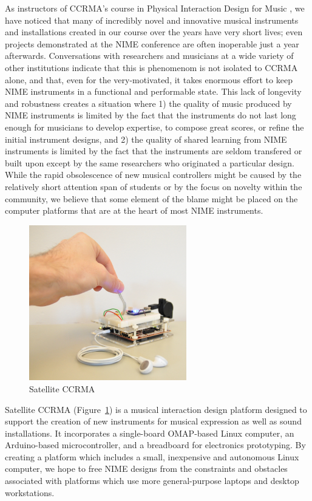 As instructors of CCRMA's course in Physical Interaction Design for Music \cite{Verplank:2001}, we have noticed that many of incredibly novel and innovative musical instruments and installations created in our course over the years have very short lives; even projects demonstrated at the NIME conference \cite{Wilkerson:2002,Shiraiwa:2003,Wilson:2003,Lugo:2005,Carlile:2005,Bowen:2005,Dahl:2007,Schlessinger:2009, Gao:2007} are often inoperable just a year afterwards. Conversations with researchers and musicians at a wide variety of other institutions indicate that this is phenomenom is not isolated to CCRMA alone, and that, even for the very-motivated, it takes enormous effort to keep NIME instruments in a functional and performable state. This lack of longevity and robustness creates a situation where 1) the quality of music produced by NIME instruments is limited by the fact that the instruments do not last long enough for musicians to develop expertise, to compose great scores, or refine the initial instrument designs, and 2) the quality of shared learning from NIME instruments is limited by the fact that the instruments are seldom transfered or built upon except by the same researchers who originated a particular design. While the rapid obsolescence of new musical controllers might be caused by the relatively short attention span of students or by the focus on novelty within the community, we believe that some element of the blame might be placed on the computer platforms that are at the heart of most NIME instruments. 

\begin{figure}[t]
	\centering
		\includegraphics[width=2.7in]{Photos/sat1.eps}
	\caption{Satellite CCRMA}
	\label{Berdahl:fig:Platform}
\end{figure}

Satellite CCRMA (Figure~\ref{Berdahl:fig:Platform}) is a musical interaction design platform designed to support the creation of new instruments for musical expression as well as sound installations. It incorporates a single-board OMAP-based Linux computer, an Arduino-based microcontroller, and a breadboard for electronics prototyping.   By creating a platform which includes a small, inexpensive and autonomous Linux computer, we hope to free NIME designs from the constraints and obstacles associated with platforms which use more general-purpose laptops and desktop workstations.

